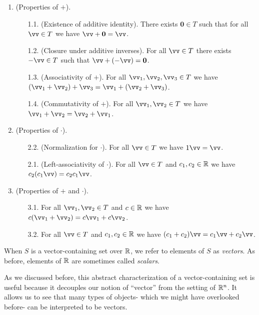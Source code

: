 \begin{defn}
    \begin{enumerate}
        \item (Properties of $+$).
        \begin{enumerate}
                \item[1.1.] (Existence of additive identity). There exists $\mathbf{0} \in T$ such that for all $\vv \in T$ we have $\vv + \mathbf{0} = \vv$.
                \item[1.2.] (Closure under additive inverses). For all $\vv \in T$ there exists $-\vv \in T$ such that $\vv + (-\vv) = \mathbf{0}$.
                \item[1.3.] (Associativity of $+$). For all $\vv_1, \vv_2, \vv_3 \in T$ we have $(\vv_1 + \vv_2) + \vv_3 = \vv_1 + (\vv_2 + \vv_3)$.
                \item[1.4.] (Commutativity of $+$). For all $\vv_1, \vv_2 \in T$ we have $\vv_1 + \vv_2 = \vv_2 + \vv_1$.
            \end{enumerate}
        \item (Properties of $\cdot$).
        \begin{enumerate}
            \item[2.2.] (Normalization for $\cdot$). For all $\vv \in T$ we have $1 \vv = \vv$.
            \item[2.1.] (Left-associativity of $\cdot$). For all $\vv \in T$ and $c_1, c_2 \in \mathbb{R}$ we have $c_2 (c_1 \vv) = c_2 c_1 \vv$.
        \end{enumerate}
        \item (Properties of $+$ and $\cdot$).
        \begin{enumerate}
            \item[3.1.] For all $\vv_1, \vv_2 \in T$ and $c \in \mathbb{R}$ we have $c(\vv_1 + \vv_2) = c \vv_1 + c \vv_2$.
            \item[3.2.] For all $\vv \in T$ and $c_1, c_2 \in \mathbb{R}$ we have $(c_1 + c_2)\vv = c_1 \vv + c_2 \vv$.
        \end{enumerate}
    \end{enumerate} 
    
    When $S$ is a vector-containing set over $\mathbb{R}$, we refer to elements of $S$ as \textit{vectors}. As before, elements of $\mathbb{R}$ are sometimes called \textit{scalars}.
\end{defn}

As we discussed before, this abstract characterization of a vector-containing set is useful because it decouples our notion of ``vector'' from the setting of $\mathbb{R}^n$. It allows us to see that many types of objects- which we might have overlooked before- can be interpreted to be vectors.


